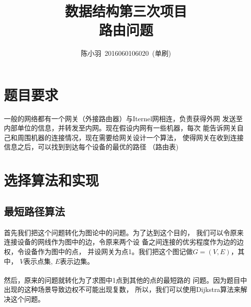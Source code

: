 \documentclass{article}
\title{数据结构第三次项目\\路由问题}
\author{陈小羽\ 2016060106020\ (单刷)}
\date{}
\begin{document}
\maketitle
\clearpage
\tableofcontents
\clearpage


\section{题目要求}
	\paragraph{}
		一般的网络都有一个网关（外接路由器）与Iternel网相连，负责获得外网
		发送至内部单位的信息，并转发至内网。现在假设内网有一些机器，每次
		能告诉网关自己和周围机器的连接情况，现在需要给网关设计一个算法，
		使得网关在收到连接信息之后，可以找到到达每个设备的最优的路径
		（路由表)
\section{选择算法和实现}
	\subsection{最短路径算法}
		\paragraph{}
			首先我们把这个问题转化为图论中的问题。为了达到这个目的，
			我们可以令原来连接设备的网线作为图中的边，令原来两个设
			备之间连接的优劣程度作为边的边权，令设备作为图中的点，
			并设网关为点1。我们把这个图记做$G = (V, E)$，其中，
			$V$表示点集, $E$表示边集。
		\paragraph{}
			然后，原来的问题就转化为了求图中1点到其他的点的最短路的
			问题。因为题目中出现的这种场景导致边权不可能出现复数，
			所以，我们可以使用Dijkstra算法来解决这个问题。
\end{document}
